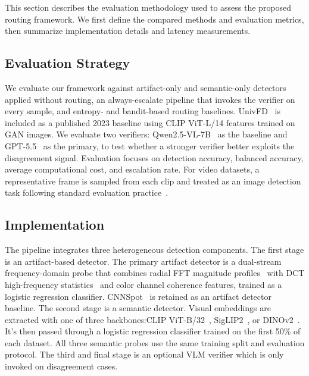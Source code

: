 \documentclass{ieeeaccess}
\begin{document}
This section describes the evaluation methodology used to assess the proposed routing framework. We first define the compared methods and evaluation metrics, then summarize implementation details and latency measurements.

\subsection{Evaluation Strategy}
We evaluate our framework against artifact-only and semantic-only detectors applied without routing, an always-escalate pipeline that invokes the verifier on every sample, and entropy- and bandit-based routing baselines. UnivFD~\cite{ojha2023fakedetect} is included
as a published 2023 baseline using CLIP ViT-L/14 features trained on GAN images. We
evaluate two verifiers: Qwen2.5-VL-7B~\cite{bai2025qwen25vltechnicalreport} as the
baseline and GPT-5.5~\cite{openai2026gpt55} as the primary, to test whether a stronger verifier better exploits the disagreement signal.
Evaluation focuses on detection accuracy, balanced accuracy, 
average computational cost, and escalation rate. For video 
datasets, a representative frame is sampled from each clip 
and treated as an image detection task following standard 
evaluation practice~\cite{wen2025busterxmllmpoweredaigeneratedvideo}.



\subsection{Implementation}

The pipeline integrates three heterogeneous detection components. The first stage is an artifact-based detector. The primary artifact detector is a dual-stream frequency-domain probe that combines radial FFT magnitude profiles~\cite{dzanic2020fourier} with DCT high-frequency statistics~\cite{frank2020leveraging, Corvi_2023_ICASSP} and color channel
coherence features, trained as a logistic regression classifier. CNNSpot~\cite{wang2020cnn} is retained as an artifact detector baseline. The second stage is a semantic detector. Visual embeddings are extracted with one of three backbones:CLIP
ViT-B/32~\cite{pmlr-v139-radford21a}, SigLIP2~\cite{tschannen2025siglip2}, or
DINOv2~\cite{oquab2023dinov2}. It's then passed through a logistic regression classifier trained on the first 50\% of each dataset. All three semantic probes use the same training split and evaluation protocol. The third and final stage is an optional VLM verifier which is only invoked 
on disagreement cases.
\end{document}
